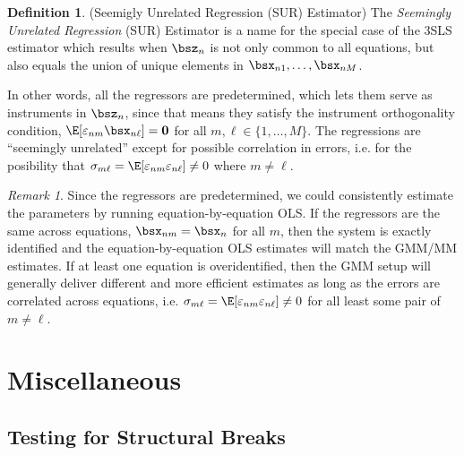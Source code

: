 \documentclass[12pt]{article}
\theoremstyle{plain}
\theoremstyle{definition}
\newtheorem{defn}[thm]{Definition}
\theoremstyle{remark}
\newtheorem*{rmk}{Remark}
\renewcommand{\bso}{\boldsymbol{0}}
\begin{document}
\begin{defn}(Seemigly Unrelated Regression (SUR) Estimator)
The \emph{Seemingly Unrelated Regression} (SUR) Estimator is a name for
the special case of the 3SLS estimator which results when $\bsz_n$ is
not only common to all equations, but also equals the union of unique
elements in $\bsx_{n1},\ldots,\bsx_{nM}$.

In other words, all the regressors are predetermined, which lets them
serve as instruments in $\bsz_n$, since that means they satisfy the
instrument orthogonality condition,
$\E[\varepsilon_{nm}\bsx_{n\ell}]=\bso$ for all
$m,\ell\in\{1,\ldots,M\}$.
The regressions are
``seemingly unrelated'' except for possible correlation in errors, i.e.
for the posibility that
$\sigma_{m\ell}=\E[\varepsilon_{nm}\varepsilon_{n\ell}]\neq0$ where
$m\neq\ell$.
\end{defn}

\begin{rmk}
Since the regressors are predetermined, we could consistently estimate
the parameters by running equation-by-equation OLS. If the regressors
are the same across equations, $\bsx_{nm}=\bsx_n$ for all $m$, then the
system is exactly identified and the equation-by-equation OLS estimates
will match the GMM/MM estimates. If at least one equation is
overidentified, then the GMM setup will generally deliver different and
more efficient estimates as long as the errors are correlated across
equations, i.e.
$\sigma_{m\ell}=\E[\varepsilon_{nm}\varepsilon_{n\ell}]\neq 0$ for all
least some pair of $m\neq\ell$.
\end{rmk}


\clearpage
\section{Miscellaneous}

\subsection{Testing for Structural Breaks}
\end{document}
